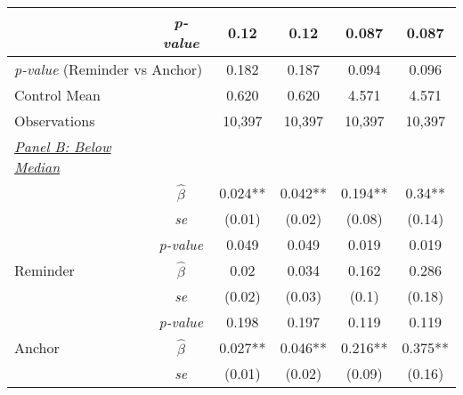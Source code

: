 \begin{tabular}{cccccc}
\multicolumn{1}{l}{} & \multicolumn{1}{c}{\scriptsize{\textit{p-value}}} & \multicolumn{1}{c}{0.12} & \multicolumn{1}{c}{0.12} & \multicolumn{1}{c}{0.087} & \multicolumn{1}{c}{0.087} \\
\midrule
\multicolumn{2}{l}{\textit{p-value} (Reminder vs Anchor)}& \multicolumn{1}{c}{0.182}& \multicolumn{1}{c}{0.187}& \multicolumn{1}{c}{0.094}& \multicolumn{1}{c}{0.096}\\
\multicolumn{2}{l}{Control Mean} &0.620&0.620&4.571&4.571\\
\multicolumn{2}{l}{Observations} &10,397&10,397&10,397&10,397\\
\midrule
\multicolumn{1}{l}{\underline{\textit{Panel B: Below Median}}} &  &  &  & &\\ 
 \addlinespace
\multicolumn{1}{l}{Any Treatment} & \multicolumn{1}{c}{\scriptsize $\hat{\beta}$} & \multicolumn{1}{c}{0.024**} & \multicolumn{1}{c}{0.042**} & \multicolumn{1}{c}{0.194**} & \multicolumn{1}{c}{0.34**} \\
\multicolumn{1}{l}{} & \multicolumn{1}{c}{\scriptsize{\textit{se}}} & \multicolumn{1}{c}{(0.01)} & \multicolumn{1}{c}{(0.02)} & \multicolumn{1}{c}{(0.08)} & \multicolumn{1}{c}{(0.14)} \\
\multicolumn{1}{l}{} & \multicolumn{1}{c}{\scriptsize{\textit{p-value}}} & \multicolumn{1}{c}{0.049} & \multicolumn{1}{c}{0.049} & \multicolumn{1}{c}{0.019} & \multicolumn{1}{c}{0.019} \\
\multicolumn{1}{l}{Reminder} & \multicolumn{1}{c}{\scriptsize $\hat{\beta}$} & \multicolumn{1}{c}{0.02} & \multicolumn{1}{c}{0.034} & \multicolumn{1}{c}{0.162} & \multicolumn{1}{c}{0.286} \\
\multicolumn{1}{l}{} & \multicolumn{1}{c}{\scriptsize{\textit{se}}} & \multicolumn{1}{c}{(0.02)} & \multicolumn{1}{c}{(0.03)} & \multicolumn{1}{c}{(0.1)} & \multicolumn{1}{c}{(0.18)} \\
\multicolumn{1}{l}{} & \multicolumn{1}{c}{\scriptsize{\textit{p-value}}} & \multicolumn{1}{c}{0.198} & \multicolumn{1}{c}{0.197} & \multicolumn{1}{c}{0.119} & \multicolumn{1}{c}{0.119} \\
\multicolumn{1}{l}{Anchor} & \multicolumn{1}{c}{\scriptsize $\hat{\beta}$} & \multicolumn{1}{c}{0.027**} & \multicolumn{1}{c}{0.046**} & \multicolumn{1}{c}{0.216**} & \multicolumn{1}{c}{0.375**} \\
\multicolumn{1}{l}{} & \multicolumn{1}{c}{\scriptsize{\textit{se}}} & \multicolumn{1}{c}{(0.01)} & \multicolumn{1}{c}{(0.02)} & \multicolumn{1}{c}{(0.09)} & \multicolumn{1}{c}{(0.16)} \\

\end{tabular}
